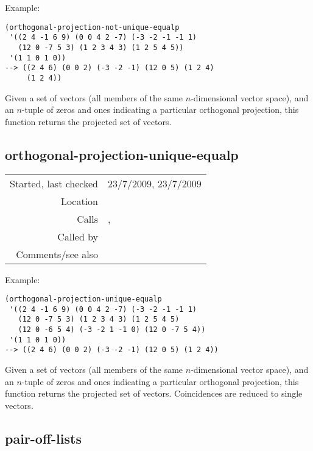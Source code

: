 \vspace{0.5cm}
\noindent Example:
\begin{verbatim}
(orthogonal-projection-not-unique-equalp
 '((2 4 -1 6 9) (0 0 4 2 -7) (-3 -2 -1 -1 1)
   (12 0 -7 5 3) (1 2 3 4 3) (1 2 5 4 5))
 '(1 1 0 1 0))
--> ((2 4 6) (0 0 2) (-3 -2 -1) (12 0 5) (1 2 4)
     (1 2 4))
\end{verbatim}

\noindent Given a set of vectors (all members of the
same $n$-dimensional vector space), and an $n$-tuple
of zeros and ones indicating a particular orthogonal
projection, this function returns the projected set of
vectors.


\subsection*{orthogonal-projection-unique-equalp}\label{fun:orthogonal-projection-unique-equalp}

\vspace{0.3cm}
\begin{tabular}{r|p{8cm}}
Started, last checked & 23/7/2009, 23/7/2009 \\
Location & \nameref{sec:projection} \\
Calls & \nameref{fun:orthogonal-projection-not-unique-equalp}, \nameref{fun:sort-dataset-asc} \\
Called by & \\
Comments/see also &
\end{tabular}

\vspace{0.5cm}
\noindent Example:
\begin{verbatim}
(orthogonal-projection-unique-equalp
 '((2 4 -1 6 9) (0 0 4 2 -7) (-3 -2 -1 -1 1)
   (12 0 -7 5 3) (1 2 3 4 3) (1 2 5 4 5)
   (12 0 -6 5 4) (-3 -2 1 -1 0) (12 0 -7 5 4))
 '(1 1 0 1 0))
--> ((2 4 6) (0 0 2) (-3 -2 -1) (12 0 5) (1 2 4))
\end{verbatim}

\noindent Given a set of vectors (all members of the
same $n$-dimensional vector space), and an $n$-tuple
of zeros and ones indicating a particular orthogonal
projection, this function returns the projected set of
vectors. Coincidences are reduced to single
vectors.


\subsection*{pair-off-lists}\label{fun:pair-off-lists}

